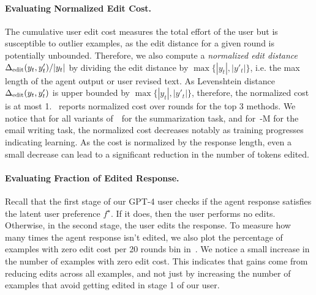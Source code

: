 \paragraph{Evaluating Normalized Edit Cost.} The cumulative user edit cost measures the total effort of the user but is susceptible to outlier examples, as the edit distance for a given round is potentially unbounded. Therefore, we also compute a \emph{normalized edit distance} $\Delta_{\textrm{edit}}(y_t, y'_t) / |y_t|$ by dividing the edit distance by $\max\{|y_t|, |y'_t|\}$, i.e. the max length of the agent output or user revised text. As Levenshtein distance $\Delta_{\textrm{edit}}(y_t, y'_t)$ is upper bounded by $\max\{|y_t|, |y'_t|\}$, therefore, the normalized cost is at most 1. ~reports normalized cost over rounds for the top 3 methods. %
We notice that for all variants of~\algname~for the summarization task, and for~-M for the email writing task, the normalized cost decreases notably as training progresses indicating learning. As the cost is normalized by the response length, even a small decrease can lead to a significant reduction in the number of tokens edited.

\paragraph{Evaluating Fraction of Edited Response.} Recall that the first stage of our GPT-4 user checks if the agent response satisfies the latent user preference $f^\star$. If it does, then the user performs no edits. Otherwise, in the second stage, the user edits the response. To measure how many times the agent response isn't edited, we also plot the percentage of examples with zero edit cost per 20 rounds bin in~. We notice a small increase in the number of examples with zero edit cost. This indicates that gains come from reducing edits across all examples, and not just by increasing the number of examples that avoid getting edited in stage 1 of our user.




